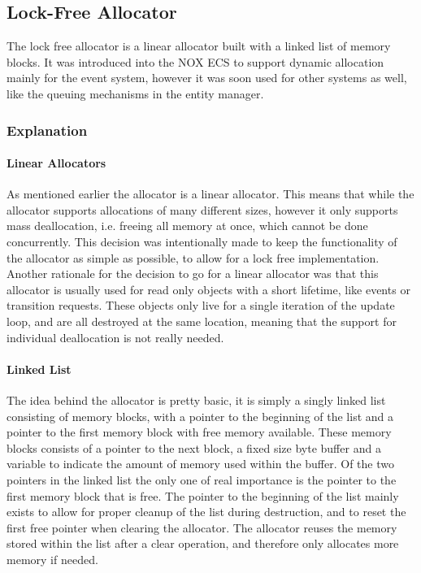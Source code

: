 \subsection{Lock-Free Allocator}
\label{subsec:detailed_lock_free_allocator}
The lock free allocator is a linear allocator built with a linked list of memory blocks.
It was introduced into the NOX ECS to support dynamic allocation mainly for the event system,
however it was soon used for other systems as well, like the queuing mechanisms in the entity manager.

\subsubsection{Explanation}
\paragraph{Linear Allocators}
As mentioned earlier the allocator is a linear allocator.
This means that while the allocator supports allocations of many different sizes,
however it only supports mass deallocation, i.e. freeing all memory at once,
which cannot be done concurrently.
This decision was intentionally made to keep the functionality of the allocator as simple
as possible, to allow for a lock free implementation.
Another rationale for the decision to go for a linear allocator was that this allocator
is usually used for read only objects with a short lifetime, like events or transition requests.
These objects only live for a single iteration of the update loop, and are all destroyed at
the same location, meaning that the support for individual deallocation is not really needed.

\paragraph{Linked List}
The idea behind the allocator is pretty basic, it is simply a singly linked list consisting of
memory blocks, with a pointer to the beginning of the list and a pointer to the first memory block
with free memory available.
These memory blocks consists of a pointer to the next block, a fixed size byte buffer
and a variable to indicate the amount of memory used within the buffer.
Of the two pointers in the linked list the only one of real importance is the pointer to the first
memory block that is free. The pointer to the beginning of the list mainly exists to allow for proper
cleanup of the list during destruction, and to reset the first free pointer when clearing the allocator.
The allocator reuses the memory stored within the list after a clear operation, and therefore only
allocates more memory if needed.

